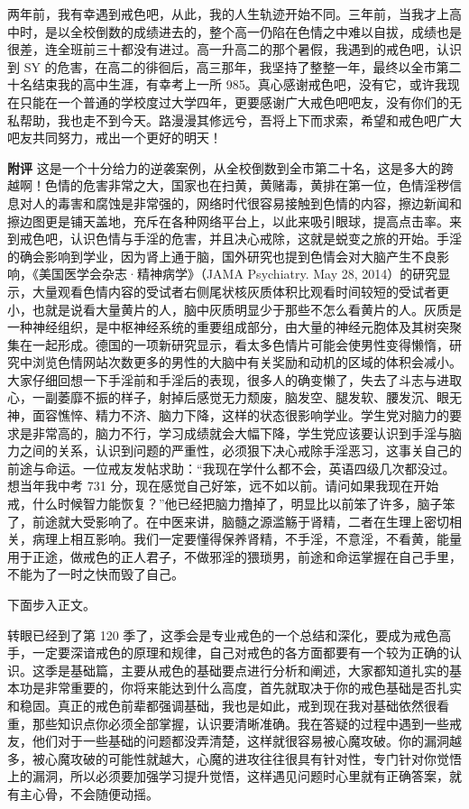 \begin{case}
    两年前，我有幸遇到戒色吧，从此，我的人生轨迹开始不同。三年前，当我才上高中时，是以全校倒数的成绩进去的，整个高一仍陷在色情之中难以自拔，成绩也是很差，连全班前三十都没有进过。高一升高二的那个暑假，我遇到的戒色吧，认识到 SY 的危害，在高二的徘徊后，高三那年，我坚持了整整一年，最终以全市第二十名结束我的高中生涯，有幸考上一所 985。真心感谢戒色吧，没有它，或许我现在只能在一个普通的学校度过大学四年，更要感谢广大戒色吧吧友，没有你们的无私帮助，我也走不到今天。路漫漫其修远兮，吾将上下而求索，希望和戒色吧广大吧友共同努力，戒出一个更好的明天！

    \textbf{附评} 这是一个十分给力的逆袭案例，从全校倒数到全市第二十名，这是多大的跨越啊！色情的危害非常之大，国家也在扫黄，黄赌毒，黄排在第一位，色情淫秽信息对人的毒害和腐蚀是非常强的，网络时代很容易接触到色情的内容，擦边新闻和擦边图更是铺天盖地，充斥在各种网络平台上，以此来吸引眼球，提高点击率。来到戒色吧，认识色情与手淫的危害，并且决心戒除，这就是蜕变之旅的开始。手淫的确会影响到学业，因为肾上通于脑，国外研究也提到色情会对大脑产生不良影响，《美国医学会杂志·精神病学》（JAMA Psychiatry. May 28, 2014）的研究显示，大量观看色情内容的受试者右侧尾状核灰质体积比观看时间较短的受试者更小，也就是说看大量黄片的人，脑中灰质明显少于那些不怎么看黄片的人。灰质是一种神经组织，是中枢神经系统的重要组成部分，由大量的神经元胞体及其树突聚集在一起形成。德国的一项新研究显示，看太多色情片可能会使男性变得懒惰，研究中浏览色情网站次数更多的男性的大脑中有关奖励和动机的区域的体积会减小。大家仔细回想一下手淫前和手淫后的表现，很多人的确变懒了，失去了斗志与进取心，一副萎靡不振的样子，射掉后感觉无力颓废，脑发空、腿发软、腰发沉、眼无神，面容憔悴、精力不济、脑力下降，这样的状态很影响学业。学生党对脑力的要求是非常高的，脑力不行，学习成绩就会大幅下降，学生党应该要认识到手淫与脑力之间的关系，认识到问题的严重性，必须狠下决心戒除手淫恶习，这事关自己的前途与命运。一位戒友发帖求助：“我现在学什么都不会，英语四级几次都没过。想当年我中考 731 分，现在感觉自己好笨，远不如以前。请问如果我现在开始戒，什么时候智力能恢复？”他已经把脑力撸掉了，明显比以前笨了许多，脑子笨了，前途就大受影响了。在中医来讲，脑髓之源滥觞于肾精，二者在生理上密切相关，病理上相互影响。我们一定要懂得保养肾精，不手淫，不意淫，不看黄，能量用于正途，做戒色的正人君子，不做邪淫的猥琐男，前途和命运掌握在自己手里，不能为了一时之快而毁了自己。
\end{case}

下面步入正文。

转眼已经到了第 120 季了，这季会是专业戒色的一个总结和深化，要成为戒色高手，一定要深谙戒色的原理和规律，自己对戒色的各方面都要有一个较为正确的认识。这季是基础篇，主要从戒色的基础要点进行分析和阐述，大家都知道扎实的基本功是非常重要的，你将来能达到什么高度，首先就取决于你的戒色基础是否扎实和稳固。真正的戒色前辈都强调基础，我也是如此，戒到现在我对基础依然很看重，那些知识点你必须全部掌握，认识要清晰准确。我在答疑的过程中遇到一些戒友，他们对于一些基础的问题都没弄清楚，这样就很容易被心魔攻破。你的漏洞越多，被心魔攻破的可能性就越大，心魔的进攻往往很具有针对性，专门针对你觉悟上的漏洞，所以必须要加强学习提升觉悟，这样遇见问题时心里就有正确答案，就有主心骨，不会随便动摇。

